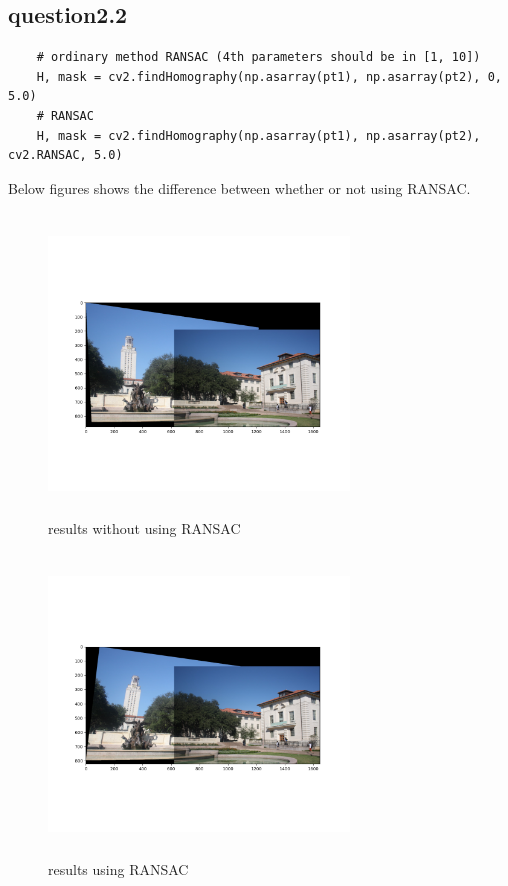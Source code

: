 \documentclass[a4paper,UTF8]{article}
\numberwithin{equation}{section}
\begin{document}
\subsection{question2.2}
\begin{lstlisting}  
	# ordinary method RANSAC (4th parameters should be in [1, 10])
    H, mask = cv2.findHomography(np.asarray(pt1), np.asarray(pt2), 0, 5.0)
    # RANSAC
    H, mask = cv2.findHomography(np.asarray(pt1), np.asarray(pt2), cv2.RANSAC, 5.0)
\end{lstlisting}
Below figures shows the difference between whether or not using RANSAC.
\begin{figure}[H]
	\centering  %
	\includegraphics[width=8cm,height=8cm]{wo_RANSAC.png}  %
	\caption{results without using RANSAC}  %
\end{figure}
\begin{figure}[H]
	\centering  %
	\includegraphics[width=8cm,height=8cm]{with_RANSAC.png}  %
	\caption{results using RANSAC}  %
\end{figure}
\end{document}
